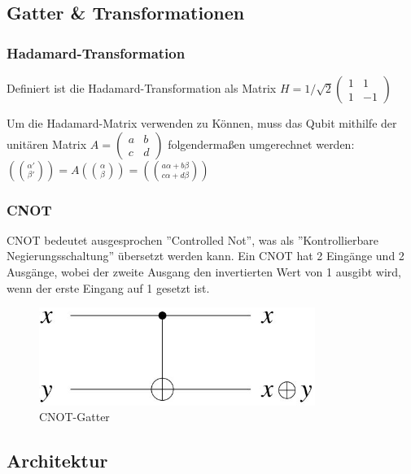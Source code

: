 \subsection{Gatter \& Transformationen}
\label{sec:gatter}

\subsubsection{Hadamard-Transformation}
\label{sec:hadamard}

Definiert ist die Hadamard-Transformation als Matrix $H = 1/\sqrt{2}\begin{pmatrix}1&1\\1&-1\end{pmatrix} $

Um die Hadamard-Matrix verwenden zu Können, muss das Qubit mithilfe der unitären Matrix $A = \begin{pmatrix}a&b\\c&d\end{pmatrix}$ folgendermaßen umgerechnet werden: $(\alpha'\choose\beta') = A(\alpha\choose\beta) = ({a\alpha + b\beta}\choose{c\alpha + d\beta})$

\subsubsection{CNOT}
\label{sec:cnot}

CNOT bedeutet ausgesprochen ''Controlled Not'', was als ''Kontrollierbare Negierungsschaltung'' übersetzt werden kann.
Ein CNOT hat 2 Eingänge und 2 Ausgänge, wobei der zweite Ausgang den invertierten Wert von 1 ausgibt wird, wenn der erste Eingang auf 1 gesetzt ist.

\begin{figure}[!htb]
	\centering\includegraphics[width=0.8\textwidth]{images/cnot.jpg}
	\caption{CNOT-Gatter}
	\label{cnot}
\end{figure}

\subsection{Architektur}
\label{sec:architektur}

